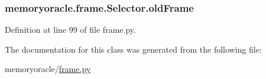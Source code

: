 \subsubsection[{old\+Frame}]{\setlength{\rightskip}{0pt plus 5cm}memoryoracle.\+frame.\+Selector.\+old\+Frame}\label{classmemoryoracle_1_1frame_1_1Selector_af45ac2d7b1133a45dfa21f83f1c5a1bc}


Definition at line 99 of file frame.\+py.



The documentation for this class was generated from the following file\+:\begin{DoxyCompactItemize}
\item 
memoryoracle/\hyperlink{frame_8py}{frame.\+py}\end{DoxyCompactItemize}
